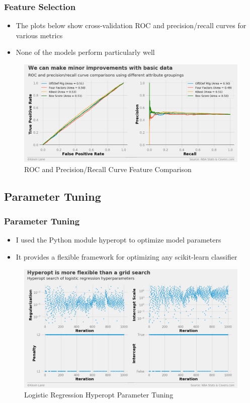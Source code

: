 \documentclass{beamer}
\begin{document}
\begin{frame}
\frametitle{Feature Selection}
\begin{itemize}
    \item The plots below show cross-validation ROC and precision/recall curves for various metrics
    \item None of the models perform particularly well
\end{itemize}
\begin{figure}
\includegraphics[scale=0.25]{../docs/assets/images/feature-selection/cross-validation-comparison.png}
\caption{ROC and Precision/Recall Curve Feature Comparison}
\end{figure}
\end{frame}

\subsection{Parameter Tuning}
\begin{frame}
\frametitle{Parameter Tuning}
\begin{itemize}
    \item I used the Python module hyperopt to optimize model parameters
    \item It provides a flexible framework for optimizing any scikit-learn classifier
\end{itemize}
\begin{figure}
\includegraphics[scale=0.25]{../docs/assets/images/parameter-tuning/logistic-regression-hyperopt.png}
\caption{Logistic Regression Hyperopt Parameter Tuning}
\end{figure}
\end{frame}
\end{document}
